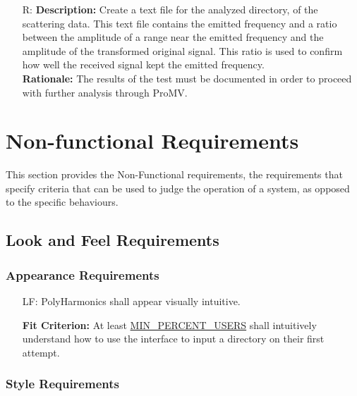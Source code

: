 \documentclass[12pt]{article}
\newcounter{reqnum} %
\newcounter{lafnum}
\newcommand{\progname}{PolyHarmonics}
\begin{document}
\begin{itemize}
\item[R\refstepcounter{reqnum}\thereqnum \label{R_TextScattered}:]
\textbf{Description:} Create a text file for the analyzed directory, of the
scattering data. This text file contains the emitted frequency and a ratio
 between the amplitude of a range near the emitted frequency and the amplitude 
 of the transformed original signal. This ratio is used to confirm how well the
received signal kept the emitted frequency. \\
\textbf{Rationale:} The results of the test must be documented in order
to proceed with further analysis through ProMV.


\end{itemize}

\section{Non-functional Requirements}

This section provides the Non-Functional requirements, the requirements that
specify criteria that can be used to judge the operation of a system, as opposed
to the specific behaviours.

\subsection{Look and Feel Requirements}

\subsubsection{Appearance Requirements}
\noindent \begin{itemize}
\item[LF\refstepcounter{lafnum}\thelafnum\label{NF_laf1}:] \progname{} shall
  appear visually intuitive.
						
  \textbf{Fit Criterion:} At least \hyperref[AppendA]{MIN\_PERCENT\_USERS}
  shall intuitively understand how to use the interface to input a directory on
  their first attempt.
\end{itemize}

\subsubsection{Style Requirements}
\end{document}
